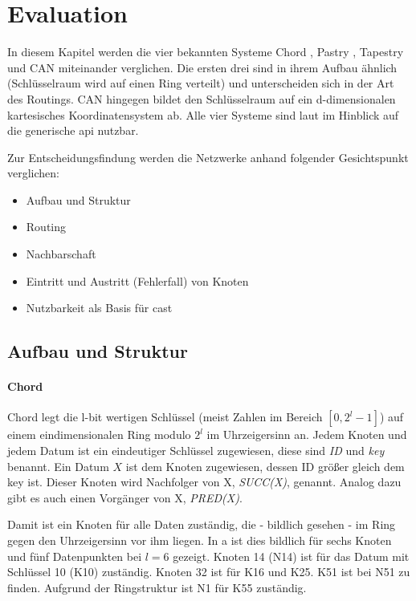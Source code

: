 


\section{Evaluation}
In diesem Kapitel werden die vier bekannten Systeme Chord \cite{Stoica2003}, Pastry \cite{Rowstron2001}, Tapestry \cite{Zhao2001Tapestry,Zhao2004Tapestry} und CAN \cite{Ratnasamy2001Scalable} miteinander verglichen. Die ersten drei sind in ihrem Aufbau ähnlich (Schlüsselraum wird auf einen Ring verteilt) und unterscheiden sich in der Art des Routings. CAN hingegen bildet den Schlüsselraum auf ein d-dimensionalen kartesisches Koordinatensystem ab. Alle vier Systeme sind laut \cite{Dabek2003Towards} im Hinblick auf die generische \ac{api} nutzbar.

Zur Entscheidungsfindung werden die Netzwerke anhand folgender Gesichtspunkt verglichen:
\begin{itemize}
\item Aufbau und Struktur
\item Routing
\item Nachbarschaft
\item Eintritt und Austritt (Fehlerfall) von Knoten
\item Nutzbarkeit als Basis für \ac{cast}
\end{itemize}

\subsection{Aufbau und Struktur}
\paragraph{Chord}
Chord \cite{Stoica2003} legt die l-bit wertigen Schlüssel (meist Zahlen im Bereich $[0,2^l-1]$) auf einem eindimensionalen Ring modulo $2^l$ im Uhrzeigersinn an. Jedem Knoten und jedem Datum ist ein eindeutiger Schlüssel zugewiesen, diese sind \emph{ID} und \emph{key} benannt. Ein Datum $X$ ist dem Knoten zugewiesen, dessen ID größer gleich dem key ist. Dieser Knoten wird Nachfolger von X, \emph{SUCC(X)}, genannt. Analog dazu gibt es auch einen Vorgänger von X, \emph{PRED(X)}.

Damit ist ein Knoten für alle Daten zuständig, die - bildlich gesehen - im Ring gegen den Uhrzeigersinn vor ihm liegen. In  a ist dies bildlich für sechs Knoten und fünf Datenpunkten bei $l=6$ gezeigt. Knoten 14 (N14) ist für das Datum mit Schlüssel 10 (K10) zuständig. Knoten 32 ist für K16 und K25. K51 ist bei N51 zu finden. Aufgrund der Ringstruktur ist N1 für K55 zuständig.

